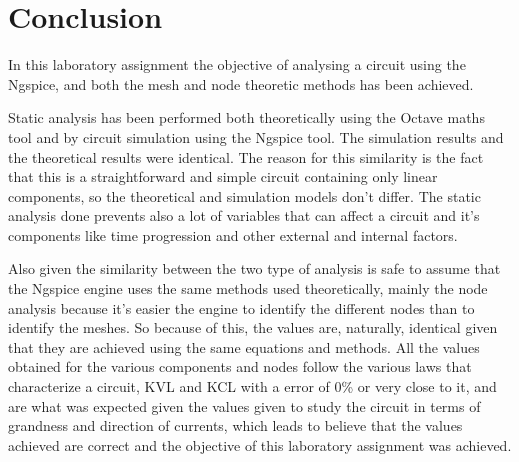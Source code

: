 \section{Conclusion}
\label{sec:conclusion}

In this laboratory assignment the objective of analysing a circuit using the Ngspice, and both the mesh and node theoretic methods has been achieved.

Static analysis has been performed both theoretically using the Octave maths tool and by circuit simulation using the Ngspice tool. The simulation results and the theoretical results were identical. The reason for this similarity is the fact that this is a straightforward and simple circuit containing only linear components, so the theoretical and simulation models don't differ. The static analysis done prevents also a lot of variables that can affect a circuit and it's components like time progression and other external and internal factors.

Also given the similarity between the two type of analysis is safe to assume that the Ngspice engine uses the same methods used theoretically, mainly the node analysis because it's easier the engine to identify the different nodes than to identify the meshes. So because of this, the values are, naturally, identical given that they are achieved using the same equations and methods.
All the values obtained for the various components and nodes follow the various laws that characterize a circuit, KVL and KCL with a error of 0\% or very close to it, and are what was expected given the values given to study the circuit in terms of grandness and direction of currents, which leads to believe that the values achieved are correct and the objective of this laboratory assignment was achieved.


